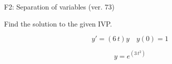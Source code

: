 \begin{exercise}
  \begin{exerciseTitle}F2: Separation of variables (ver. 73)\end{exerciseTitle}
  \begin{exerciseStatement}
    
Find the solution to the given IVP.

    
\[y'=( 6 \, t )y\hspace{1em} y(0)= 1\]

  \end{exerciseStatement}
  \begin{exerciseAnswer}
    
\[y= e^{\left(3 \, t^{2}\right)}\]

  \end{exerciseAnswer}
\end{exercise}